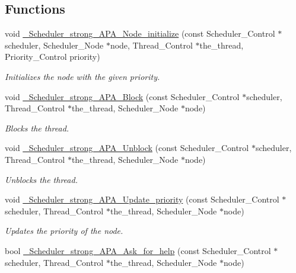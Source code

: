 \subsection*{Functions}
\begin{DoxyCompactItemize}
\item 
void \hyperlink{group__RTEMSScoreSchedulerStrongAPA_ga1cde4345d4dc0b5a37a696fa446bb47e}{\+\_\+\+Scheduler\+\_\+strong\+\_\+\+A\+P\+A\+\_\+\+Node\+\_\+initialize} (const Scheduler\+\_\+\+Control $\ast$scheduler, Scheduler\+\_\+\+Node $\ast$node, Thread\+\_\+\+Control $\ast$the\+\_\+thread, Priority\+\_\+\+Control priority)
\begin{DoxyCompactList}\small\item\em Initializes the node with the given priority. \end{DoxyCompactList}\item 
void \hyperlink{group__RTEMSScoreSchedulerStrongAPA_ga0f3ca9f9dcaff88a5df871622caf5e3f}{\+\_\+\+Scheduler\+\_\+strong\+\_\+\+A\+P\+A\+\_\+\+Block} (const Scheduler\+\_\+\+Control $\ast$scheduler, Thread\+\_\+\+Control $\ast$the\+\_\+thread, Scheduler\+\_\+\+Node $\ast$node)
\begin{DoxyCompactList}\small\item\em Blocks the thread. \end{DoxyCompactList}\item 
void \hyperlink{group__RTEMSScoreSchedulerStrongAPA_ga6b96ab0939d82ee5813092159265840e}{\+\_\+\+Scheduler\+\_\+strong\+\_\+\+A\+P\+A\+\_\+\+Unblock} (const Scheduler\+\_\+\+Control $\ast$scheduler, Thread\+\_\+\+Control $\ast$the\+\_\+thread, Scheduler\+\_\+\+Node $\ast$node)
\begin{DoxyCompactList}\small\item\em Unblocks the thread. \end{DoxyCompactList}\item 
void \hyperlink{group__RTEMSScoreSchedulerStrongAPA_ga3cdc0079d2d16a392834bd03b5115ad9}{\+\_\+\+Scheduler\+\_\+strong\+\_\+\+A\+P\+A\+\_\+\+Update\+\_\+priority} (const Scheduler\+\_\+\+Control $\ast$scheduler, Thread\+\_\+\+Control $\ast$the\+\_\+thread, Scheduler\+\_\+\+Node $\ast$node)
\begin{DoxyCompactList}\small\item\em Updates the priority of the node. \end{DoxyCompactList}\item 
bool \hyperlink{group__RTEMSScoreSchedulerStrongAPA_gad863eddc3fa4e2d785fb64af6505e90b}{\+\_\+\+Scheduler\+\_\+strong\+\_\+\+A\+P\+A\+\_\+\+Ask\+\_\+for\+\_\+help} (const Scheduler\+\_\+\+Control $\ast$scheduler, Thread\+\_\+\+Control $\ast$the\+\_\+thread, Scheduler\+\_\+\+Node $\ast$node)

\end{DoxyCompactItemize}

